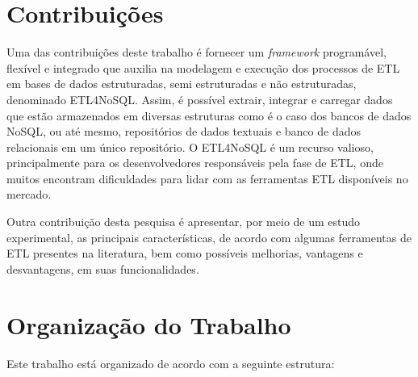 
\section{Contribuições}

Uma das contribuições deste trabalho é fornecer um \textit{framework} programável, flexível e integrado que auxilia na modelagem e execução dos processos de ETL em bases de dados estruturadas, semi estruturadas e não estruturadas, denominado ETL4NoSQL. Assim, é possível extrair, integrar e carregar dados que estão armazenados em diversas estruturas como é o caso dos bancos de dados NoSQL, ou até mesmo, repositórios de dados textuais e banco de dados relacionais em um único repositório. O ETL4NoSQL é um recurso valioso, principalmente para os desenvolvedores responsáveis pela fase de ETL, onde muitos encontram dificuldades para lidar com as ferramentas ETL disponíveis no mercado. 

Outra contribuição desta pesquisa é apresentar, por meio de um estudo experimental, as principais características, de acordo com algumas ferramentas de ETL presentes na literatura, bem como possíveis melhorias, vantagens e desvantagens, em suas funcionalidades.

\section{Organização do Trabalho}

Este trabalho está organizado de acordo com a seguinte estrutura:

